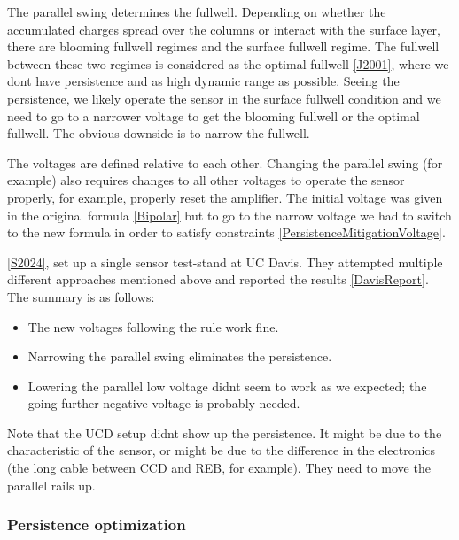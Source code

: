 The parallel swing determines the fullwell. Depending on whether the
accumulated charges spread over the columns or interact with the surface
layer, there are blooming fullwell regimes and the surface fullwell
regime. The fullwell between these two regimes is considered as the
optimal fullwell \hyperref[J2001]{{[}J2001{]}}, where we
don\textquotesingle t have persistence and as high dynamic range as
possible. Seeing the persistence, we likely operate the sensor in the
surface fullwell condition and we need to go to a narrower voltage to
get the blooming fullwell or the optimal fullwell. The obvious downside
is to narrow the fullwell.

The voltages are defined relative to each other. Changing the parallel
swing (for example) also requires changes to all other voltages to
operate the sensor properly, for example, properly reset the amplifier.
The initial voltage was given in the original formula
\hyperref[Bipolar]{{[}Bipolar{]}} but to go to the narrow voltage we had
to switch to the new formula in order to satisfy constraints
\hyperref[PersistenceMitigationVoltage]{{[}PersistenceMitigationVoltage{]}}.

\hyperref[S2024]{{[}S2024{]}}, set up a single sensor test-stand at UC
Davis. They attempted multiple different approaches mentioned above and
reported the results \hyperref[DavisReport]{{[}DavisReport{]}}. The
summary is as follows:

\begin{itemize}
\tightlist
\item
  The new voltages following the rule work fine.
\item
  Narrowing the parallel swing eliminates the persistence.
\item
  Lowering the parallel low voltage didn\textquotesingle t seem to work
  as we expected; the going further negative voltage is probably needed.
\end{itemize}

Note that the UCD setup didn\textquotesingle t show up the persistence.
It might be due to the characteristic of the sensor, or might be due to
the difference in the electronics (the long cable between CCD and REB,
for example). They need to move the parallel rails up.

\subsubsection{Persistence
optimization}\label{persistence-optimization-1}

